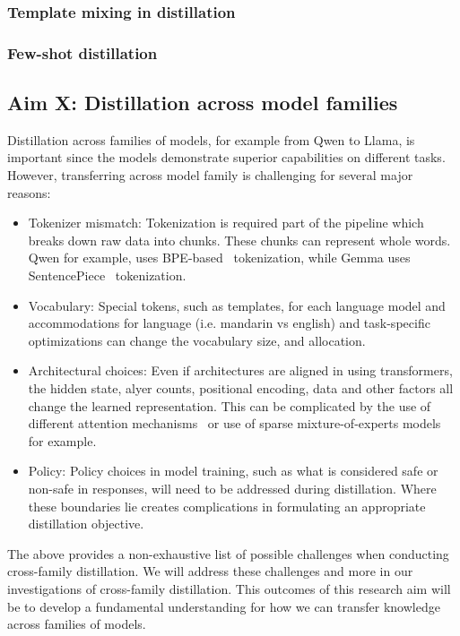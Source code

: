 \subsubsection{Template mixing in distillation}

\subsubsection{Few-shot distillation}

\subsection{Aim X: Distillation across model families}
Distillation across families of models, for example from Qwen to Llama, is important since the models demonstrate superior capabilities on different tasks. However, transferring across model family is challenging for several major reasons:
\begin{itemize}
    \item Tokenizer mismatch: Tokenization is required part of the pipeline which breaks down raw data into chunks. These chunks can represent whole words. Qwen for example, uses BPE-based~\cite{qwenteam2025qwen3} tokenization, while Gemma uses SentencePiece~\cite{kudo2018sentencepiece} tokenization. 
    \item Vocabulary: Special tokens, such as templates, for each language model and accommodations for language (i.e. mandarin vs english) and task-specific optimizations can change the vocabulary size, and allocation. 
    \item Architectural choices: Even if architectures are aligned in using transformers, the hidden state, alyer counts, positional encoding, data and other factors all change the learned representation. This can be complicated by the use of different attention mechanisms~\cite{gu2023mamba, peng2023rwkv} or use of sparse mixture-of-experts models for example. 
    \item Policy: Policy choices in model training, such as what is considered safe or non-safe in responses, will need to be addressed during distillation. Where these boundaries lie creates complications in formulating an appropriate distillation objective.
\end{itemize}
The above provides a non-exhaustive list of possible challenges when conducting cross-family distillation. We will address these challenges and more in our investigations of cross-family distillation. This outcomes of this research aim will be to develop a fundamental understanding for how we can transfer knowledge across families of models. 

